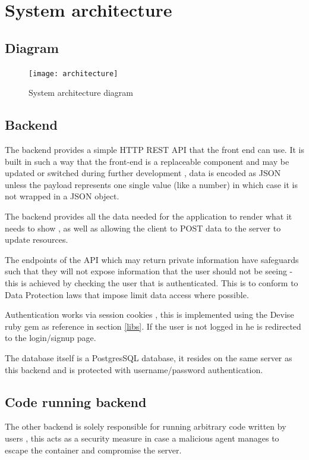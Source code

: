 \section{System architecture}

\subsection{Diagram}

\begin{figure}[H]
  \centering

	\texttt{[image: architecture]}
	\caption{System architecture diagram}
\end{figure}


\subsection{Backend}
The backend provides a simple HTTP REST API that the front end can use. It is built in such a way that the front-end is a replaceable component and may be updated or switched during further development , data is encoded as JSON unless the payload represents one single value (like a number) in which case it is not wrapped in a JSON object.

The backend provides all the data needed for the application to render what it needs to show , as well as allowing the client to POST data to the server to update resources.

The endpoints of the API which may return private information have safeguards such that they will not expose information that the user should not be seeing - this is achieved by checking the user that is authenticated. This is to conform to Data Protection laws that impose limit data access where possible.

Authentication works via session cookies , this is implemented using the Devise ruby gem as reference in section \ref{libs}. If the user is not logged in he is redirected to the login/signup page.

The database itself is a PostgresSQL database, it resides on the same server as this backend and is protected with username/password authentication.

\subsection{Code running backend}
The other backend is solely responsible for running arbitrary code written by users , this acts as a security measure in case a malicious agent manages to escape the container and compromise the server.

